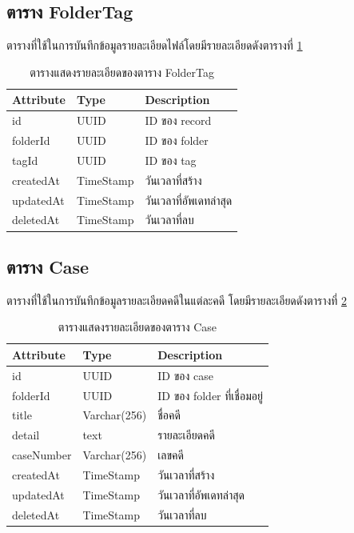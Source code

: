 \documentclass[12pt,oneside,openright,a4paper]{cpe-thai-project}
\begin{document}
\subsection{ตาราง FolderTag}
ตารางที่ใช้ในการบันทึกข้อมูลรายละเอียดไฟล์โดยมีรายละเอียดดังตารางที่ \ref{tbl:dbFolderTag}
\begin{table}[!h]
    \centering
    \begin{tabular}{|l|l|l|}
    \hline
    \textbf{Attribute} & \textbf{Type} & \textbf{Description}   \\ \hline
    id        & UUID      & ID ของ record          \\ \hline
    folderId  & UUID      & ID ของ folder          \\ \hline
    tagId     & UUID      & ID ของ tag             \\ \hline
    createdAt & TimeStamp & วันเวลาที่สร้าง        \\ \hline
    updatedAt & TimeStamp & วันเวลาที่อัพเดทล่าสุด \\ \hline
    deletedAt & TimeStamp & วันเวลาที่ลบ     \\ \hline
    \end{tabular}
    \caption{\centering  ตารางแสดงรายละเอียดของตาราง FolderTag} \label{tbl:dbFolderTag}
\end{table}



\subsection{ตาราง Case}
ตารางที่ใช้ในการบันทึกข้อมูลรายละเอียดคดีในแต่ละคดี โดยมีรายละเอียดดังตารางที่ \ref{tbl:dbCase}
\begin{table}[!h]
    \centering
    \begin{tabular}{|l|l|l|}
    \hline
    \textbf{Attribute} & \textbf{Type} & \textbf{Description}   \\ \hline
    id         & UUID        & ID ของ case                 \\ \hline
    folderId   & UUID        & ID ของ folder ที่เชื่อมอยู่ \\ \hline
    title      & Varchar(256) & ชื่อคดี                     \\ \hline
    detail     & text        & รายละเอียดคดี               \\ \hline
    caseNumber & Varchar(256) & เลขคดี                      \\ \hline
    createdAt  & TimeStamp   & วันเวลาที่สร้าง             \\ \hline
    updatedAt  & TimeStamp   & วันเวลาที่อัพเดทล่าสุด      \\ \hline
    deletedAt  & TimeStamp   & วันเวลาที่ลบ     \\ \hline
    \end{tabular}
    \caption{\centering  ตารางแสดงรายละเอียดของตาราง Case} \label{tbl:dbCase}
\end{table}
\end{document}
